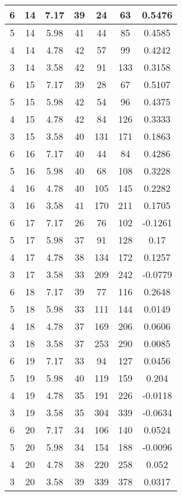 \documentclass[letterpaper, 12pt]{article}
\begin{document}
\begin{longtable}{|c|c|c|c|c|c|c|}
\hline
6 & 14 & 7.17 & 39 & 24 & 63 & 0.5476 \\
\hline
5 & 14 & 5.98 & 41 & 44 & 85 & 0.4585 \\
\hline
4 & 14 & 4.78 & 42 & 57 & 99 & 0.4242 \\
\hline
3 & 14 & 3.58 & 42 & 91 & 133 & 0.3158 \\
\hline
6 & 15 & 7.17 & 39 & 28 & 67 & 0.5107 \\
\hline
5 & 15 & 5.98 & 42 & 54 & 96 & 0.4375 \\
\hline
4 & 15 & 4.78 & 42 & 84 & 126 & 0.3333 \\
\hline
3 & 15 & 3.58 & 40 & 131 & 171 & 0.1863 \\
\hline
6 & 16 & 7.17 & 40 & 44 & 84 & 0.4286 \\
\hline
5 & 16 & 5.98 & 40 & 68 & 108 & 0.3228 \\
\hline
4 & 16 & 4.78 & 40 & 105 & 145 & 0.2282 \\
\hline
3 & 16 & 3.58 & 41 & 170 & 211 & 0.1705 \\
\hline
6 & 17 & 7.17 & 26 & 76 & 102 & -0.1261 \\
\hline
5 & 17 & 5.98 & 37 & 91 & 128 & 0.17 \\
\hline
4 & 17 & 4.78 & 38 & 134 & 172 & 0.1257 \\
\hline
3 & 17 & 3.58 & 33 & 209 & 242 & -0.0779 \\
\hline
6 & 18 & 7.17 & 39 & 77 & 116 & 0.2648 \\
\hline
5 & 18 & 5.98 & 33 & 111 & 144 & 0.0149 \\
\hline
4 & 18 & 4.78 & 37 & 169 & 206 & 0.0606 \\
\hline
3 & 18 & 3.58 & 37 & 253 & 290 & 0.0085 \\
\hline
6 & 19 & 7.17 & 33 & 94 & 127 & 0.0456 \\
\hline
5 & 19 & 5.98 & 40 & 119 & 159 & 0.204 \\
\hline
4 & 19 & 4.78 & 35 & 191 & 226 & -0.0118 \\
\hline
3 & 19 & 3.58 & 35 & 304 & 339 & -0.0634 \\
\hline
6 & 20 & 7.17 & 34 & 106 & 140 & 0.0524 \\
\hline
5 & 20 & 5.98 & 34 & 154 & 188 & -0.0096 \\
\hline
4 & 20 & 4.78 & 38 & 220 & 258 & 0.052 \\
\hline
3 & 20 & 3.58 & 39 & 339 & 378 & 0.0317 \\
\hline
\end{longtable}
\end{document}
